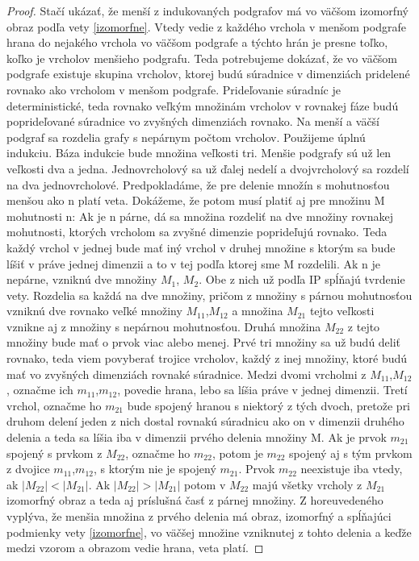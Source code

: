 \begin{proof}
Stačí ukázať, že menší z indukovaných podgrafov má vo väčšom izomorfný obraz
podľa vety \ref{izomorfne}. Vtedy vedie z každého vrchola v menšom podgrafe
hrana do nejakého vrchola vo väčšom podgrafe a týchto hrán je presne toľko, koľko je
vrcholov menšieho podgrafu.
Teda potrebujeme dokázať, že vo väčšom podgrafe existuje skupina vrcholov,
ktorej budú súradnice v dimenziách pridelené rovnako ako vrcholom v menšom
podgrafe. Prideľovanie súradníc je deterministické, teda rovnako veľkým
množinám vrcholov v rovnakej fáze budú poprideľované súradnice vo zvyšných
dimenziách rovnako. Na menší a väčší podgraf sa rozdelia grafy s nepárnym
počtom vrcholov.
Použijeme úplnú indukciu. Báza indukcie bude množina veľkosti tri. Menšie
podgrafy sú už len veľkosti dva a jedna. Jednovrcholový sa už ďalej nedelí a
dvojvrcholový sa rozdelí na dva jednovrcholové.
Predpokladáme, že pre delenie množín s mohutnosťou menšou ako n platí veta.
Dokážeme, že potom musí platiť aj pre množinu M mohutnosti n: Ak je n párne,
dá sa množina rozdeliť na dve množiny rovnakej mohutnosti, ktorých vrcholom
sa zvyšné dimenzie poprideľujú rovnako. Teda každý vrchol v jednej bude mať
iný vrchol v druhej množine s ktorým sa bude líšiť v práve jednej dimenzii
a to v tej podľa ktorej sme M rozdelili.
Ak n je nepárne, vzniknú dve množiny $M_{1}$, $M_{2}$. Obe z nich už
podľa IP spĺňajú tvrdenie vety. Rozdelia sa každá na dve množiny, pričom z
množiny s párnou mohutnosťou vzniknú dve rovnako veľké množiny
$M_{11}$,$M_{12}$ a množina $M_{21}$
tejto veľkosti vznikne aj z množiny s nepárnou mohutnosťou. Druhá množina
$M_{22}$ z tejto množiny bude mať o prvok viac alebo menej.
Prvé tri množiny sa už budú deliť rovnako, teda viem povyberať trojice
vrcholov, každý z inej množiny, ktoré budú mať vo zvyšných dimenziách
rovnaké súradnice. Medzi dvomi vrcholmi z $M_{11}$,$M_{12}$, označme ich 
$m_{11}$,$m_{12}$,  povedie hrana,
lebo sa líšia práve v jednej dimenzii. Tretí vrchol, označme ho $m_{21}$
 bude spojený hranou s
niektorý z tých dvoch, pretože pri druhom delení jeden z nich dostal rovnakú
súradnicu ako on v dimenzii druhého delenia a teda sa líšia iba v dimenzii
prvého delenia množiny M. Ak je prvok $m_{21}$ spojený s prvkom z
$M_{22}$, označme ho $m_{22}$, potom je $m_{22}$ spojený aj s tým prvkom
z dvojice $m_{11}$,$m_{12}$, s ktorým nie je spojený $m_{21}$.
Prvok $m_{22}$ neexistuje iba vtedy, ak $|M_{22}|<|M_{21}|$. 
Ak $|M_{22}|>|M_{21}|$ potom v $M_{22}$ majú všetky vrcholy z $M_{21}$
izomorfný obraz a teda aj príslušná časť z párnej množiny.
Z horeuvedeného vyplýva, že menšia množina z prvého delenia má obraz,
izomorfný a spĺňajúci podmienky vety \ref{izomorfne}, 
vo väčšej množine vzniknutej z tohto delenia a keďže 
medzi vzorom a obrazom vedie hrana, veta platí.
\end{proof}

